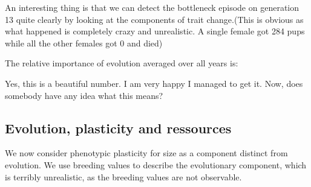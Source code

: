 \documentclass{article}\usepackage{knitr}
\begin{document}
An interesting thing is that we can detect the bottleneck episode on generation 13 quite clearly by looking at the components of trait change.(This is obvious as what happened is completely crazy and unrealistic. A single female got 284 pups while all the other females got 0 and died)

\begin{knitrout}
\color{fgcolor}\begin{kframe}


{\ttfamily\noindent\bfseries\color{errorcolor}{\#\# Error: object 'females' not found}}

{\ttfamily\noindent\bfseries\color{errorcolor}{\#\# Error: object 'evol' not found}}

{\ttfamily\noindent\bfseries\color{errorcolor}{\#\# Error: object 'ecol' not found}}

{\ttfamily\noindent\bfseries\color{errorcolor}{\#\# Error: object 'evol' not found}}

{\ttfamily\noindent\bfseries\color{errorcolor}{\#\# Error: plot.new has not been called yet}}\end{kframe}
\end{knitrout}


The relative importance of evolution averaged over all years is:
\begin{knitrout}
\color{fgcolor}\begin{kframe}
\begin{alltt}
\hlstd{(}\hlopt{/}\hlstd{(} \hlopt{+} 
\end{alltt}


{\ttfamily\noindent\bfseries\color{errorcolor}{\#\# Error: object 'evol' not found}}\end{kframe}
\end{knitrout}

Yes, this is a beautiful number. I am very happy I managed to get it. Now, does somebody have any idea what this means?


\subsection{Evolution, plasticity and ressources}
We now consider phenotypic plasticity for size as a component distinct from evolution. We use breeding values to describe the evolutionary component, which is terribly unrealistic, as the breeding values are not observable.
\end{document}
